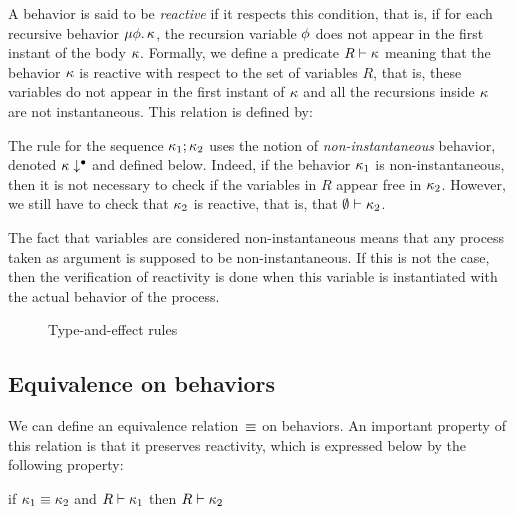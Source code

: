 \documentclass[9pt,preprint]{sigplanconf}
\begin{document}
A behavior is said to be \emph{reactive} if it respects this condition, that is, if for each recursive behavior $\mu \phi.\, \kappa$, the recursion variable $\phi$ does not appear in the first instant of the body $\kappa$. Formally, we define a predicate $R \vdash \kappa$ meaning that the behavior $\kappa$ is reactive with respect to the set of variables $R$, that is, these variables do not appear in the first instant of $\kappa$ and all the recursions inside $\kappa$ are not instantaneous. This relation is defined by:

\begin{small}

\end{small}

The rule for the sequence $\kappa_1 ; \kappa_2$ uses the notion of \emph{non-instantaneous} behavior, denoted $\kappa\downarrow^{\bullet}$ and defined below. Indeed, if the behavior $\kappa_1$ is non-instantaneous, then it is not necessary to check if the variables in $R$ appear free in $\kappa_2$. However, we still have to check that $\kappa_2$ is reactive, that is, that $\emptyset \vdash \kappa_2$.

\begin{small}

\end{small}

The fact that variables are considered non-instantaneous means that any process taken as argument is supposed to be non-instantan\-eous. If this is not the case, then the verification of reactivity is done when this variable is instantiated with the actual behavior of the process.

\begin{figure*}[t]


\caption{Type-and-effect rules}
\label{fig:rules}
\end{figure*}

\subsection{Equivalence on behaviors}
\label{sec:equiv_behaviors}

We can define an equivalence relation~$\equiv$ on behaviors. An important property of this relation is that it preserves reactivity, which is expressed below by the following property:
\begin{property}
\label{prop:equiv_reactivty}
if $\kappa_1 \equiv \kappa_2$ and $R \vdash \kappa_1$ then $R \vdash \kappa_2$
\end{property}
\end{document}
